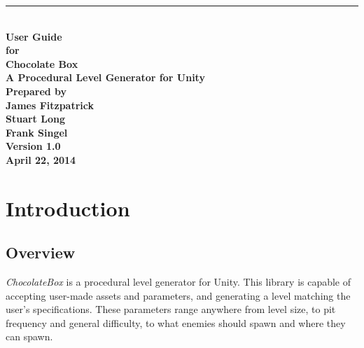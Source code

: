 \documentclass[pdftex,12pt,letter]{article}
\newcommand{\HRule}{\rule{\linewidth}{0.5mm}}
\begin{document}
\begin{titlepage}
\begin{flushright}
\HRule \\[0.4cm]
{ \bfseries
{\huge User Guide\\[1cm]}
{\Large for\\[1cm]}
{\huge Chocolate Box\large\\[.1cm]
A Procedural Level Generator for Unity\\[3cm]}
{\large Prepared by\\[1cm]James Fitzpatrick\\Stuart Long\\Frank Singel\\[2cm]
Version 1.0\\
April 22, 2014\\
}}
\end{flushright}
\end{titlepage}
\FloatBarrier
\newpage
\tableofcontents
\newpage

\section{Introduction}
\subsection{Overview}
\textit{ChocolateBox} is a procedural level generator for Unity. This library is capable of accepting user-made assets and parameters, and generating a level matching the user's specifications. These parameters range anywhere from level size, to pit frequency and general difficulty, to what enemies should spawn and where they can spawn.
\end{document}

